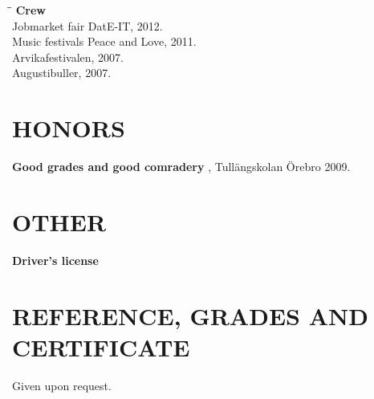 \documentclass[11pt]{res}
\begin{document}
\begin{resume}
\vspace{-30pt}



	\begin{tabbing}
		\hspace{2.3in}\= \hspace{2.6in}\= \kill %
		{\bf Crew}\\
		Jobmarket fair \> DatE-IT, 2012. \\
		Music festivals \> Peace and Love, 2011. \\
	   		           \> Arvikafestivalen, 2007.\\
		    		   \> Augustibuller, 2007.
	\end{tabbing}

\section{HONORS}          
    {\bf Good grades and good comradery} , Tullängskolan Örebro 2009. 


\section{OTHER}          
    {\bf Driver's license}

\section{REFERENCE, GRADES AND CERTIFICATE}
Given upon request.
\end{resume}
\end{document}
